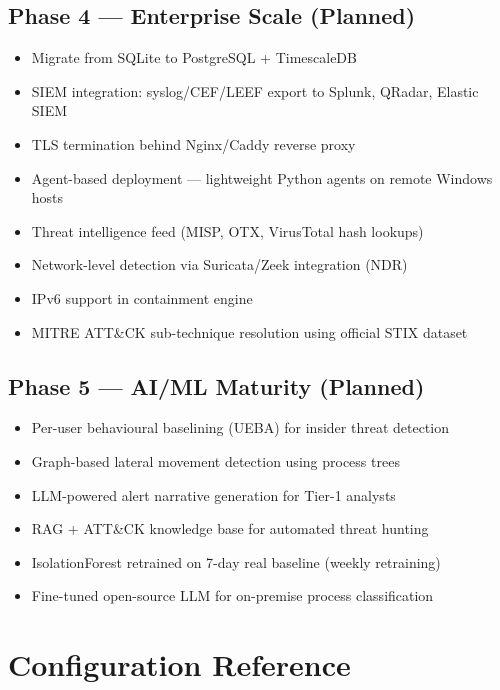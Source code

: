 \documentclass[12pt,a4paper]{article}
\begin{document}
\subsection{Phase 4 — Enterprise Scale (Planned)}

\begin{itemize}[leftmargin=*, noitemsep]
    \item Migrate from SQLite to PostgreSQL + TimescaleDB
    \item SIEM integration: syslog/CEF/LEEF export to Splunk, QRadar, Elastic SIEM
    \item TLS termination behind Nginx/Caddy reverse proxy
    \item Agent-based deployment — lightweight Python agents on remote Windows hosts
    \item Threat intelligence feed (MISP, OTX, VirusTotal hash lookups)
    \item Network-level detection via Suricata/Zeek integration (NDR)
    \item IPv6 support in containment engine
    \item MITRE ATT\&CK sub-technique resolution using official STIX dataset
\end{itemize}

\subsection{Phase 5 — AI/ML Maturity (Planned)}

\begin{itemize}[leftmargin=*, noitemsep]
    \item Per-user behavioural baselining (UEBA) for insider threat detection
    \item Graph-based lateral movement detection using process trees
    \item LLM-powered alert narrative generation for Tier-1 analysts
    \item RAG + ATT\&CK knowledge base for automated threat hunting
    \item IsolationForest retrained on 7-day real baseline (weekly retraining)
    \item Fine-tuned open-source LLM for on-premise process classification
\end{itemize}

\section{Configuration Reference}
\end{document}
